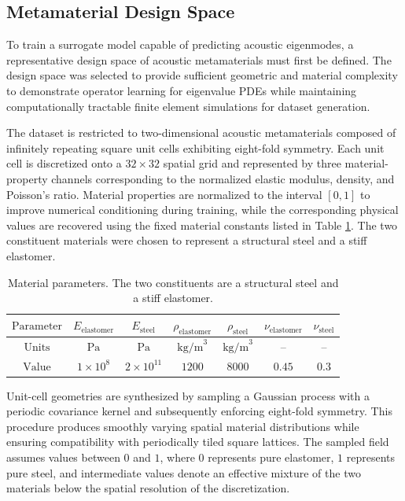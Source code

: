 \documentclass[preprint,review,12pt,numafflabel]{elsarticle}
\begin{document}

\subsection{Metamaterial Design Space}
\label{ssec:metamaterial_design_space}
To train a surrogate model capable of predicting acoustic eigenmodes, a representative design space of acoustic metamaterials must first be defined. The design space was selected to provide sufficient geometric and material complexity to demonstrate operator learning for eigenvalue PDEs while maintaining computationally tractable finite element simulations for dataset generation.

The dataset is restricted to two-dimensional acoustic metamaterials composed of infinitely repeating square unit cells exhibiting eight-fold symmetry. Each unit cell is discretized onto a $32\times32$ spatial grid and represented by three material-property channels corresponding to the normalized elastic modulus, density, and Poisson's ratio. Material properties are normalized to the interval $[0,1]$ to improve numerical conditioning during training, while the corresponding physical values are recovered using the fixed material constants listed in Table \ref{tab:parameter_ranges}. The two constituent materials were chosen to represent a structural steel and a stiff elastomer.

\begin{table}[h]
  \centering
  \begin{tabular}{|c|c|c|c|c|c|c|}
    \hline
    $\text{Parameter}$ & $E_{\text{elastomer}}$ & $E_{\text{steel}}$ & $\rho_{\text{elastomer}}$ & $\rho_{\text{steel}}$ & $\nu_{\text{elastomer}}$ & $\nu_{\text{steel}}$ \\
    \hline
    $\text{Units}$ & $\text{Pa}$ & $\text{Pa}$ & $\text{kg/m}^3$ & $\text{kg/m}^3$ & -- & -- \\
    \hline
    $\text{Value}$ & $1 \times 10^{8}$ & $2 \times 10^{11}$ & $1200$ & $8000$ & $0.45$ & $0.3$ \\
    \hline
  \end{tabular}
  \caption{Material parameters. The two constituents are a structural steel and a stiff elastomer.}
  \label{tab:parameter_ranges}
\end{table}

Unit-cell geometries are synthesized by sampling a Gaussian process with a periodic covariance kernel and subsequently enforcing eight-fold symmetry. This procedure produces smoothly varying spatial material distributions while ensuring compatibility with periodically tiled square lattices. The sampled field assumes values between $0$ and $1$, where $0$ represents pure elastomer, $1$ represents pure steel, and intermediate values denote an effective mixture of the two materials below the spatial resolution of the discretization.
\end{document}
